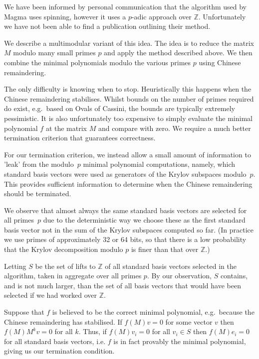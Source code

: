 \documentclass{sig-alternate-05-2015}
\begin{document}
We have been informed by personal communication that the algorithm used by
Magma \cite{magma} uses spinning, however it uses a $p$-adic approach over
$\mathbb{Z}$. Unfortunately we have not been able to find a publication
outlining their method.

We describe a multimodular variant of this idea. The idea is to reduce the
matrix $M$ modulo many small primes $p$ and apply the method described above.
We then combine the minimal polynomials modulo the various primes $p$ using
Chinese remaindering.

The only difficulty is knowing when to stop. Heuristically this happens
when the Chinese remaindering stabilises. Whilst bounds on the number of
primes required do exist, e.g.\ based on Ovals of Cassini, the bounds are
typically extremely pessimistic.
It is also unfortunately too expensive to simply evaluate the minimal polynomial
$f$ at the matrix $M$ and compare with zero.
We require a much better termination
criterion that guarantees correctness.

For our termination criterion, we instead allow a small amount of
information to 'leak' from the modulo~$p$ minimal polynomial computations,
namely, which standard basis vectors were used as generators of the Krylov
subspaces modulo~$p$. This provides sufficient information to determine
when the Chinese remaindering should be terminated.

We observe that almost always the same standard basis vectors are selected
for all primes~$p$ due to the deterministic way we choose these as the
first standard basis vector not in the sum of the Krylov subspaces computed
so far. (In practice we use primes of approximately 32 or 64 bits, so that
there is a low probability that the Krylov decomposition modulo $p$ is finer
than that over $\mathbb{Z}$.)

Letting $S$ be the set of lifts to $\mathbb{Z}$ of all standard basis vectors
selected in the algorithm, taken in aggregate over all primes $p$. By our
observation, $S$ contains, and is not much larger, than the set of all basis
vectors that would have been selected if we had worked over $\mathbb{Z}$.

Suppose that $f$ is believed to be the correct minimal polynomial, e.g.\
because the Chinese remaindering has stabilised. If $f(M)v = 0$ for some vector
$v$ then $f(M)M^kv = 0$ for all $k$. Thus, if $f(M)v_i = 0$ for all $v_i \in S$
then $f(M)e_i = 0$ for all standard basis vectors, i.e. $f$ is in fact provably
the minimal polynomial, giving us our termination condition.
\end{document}
